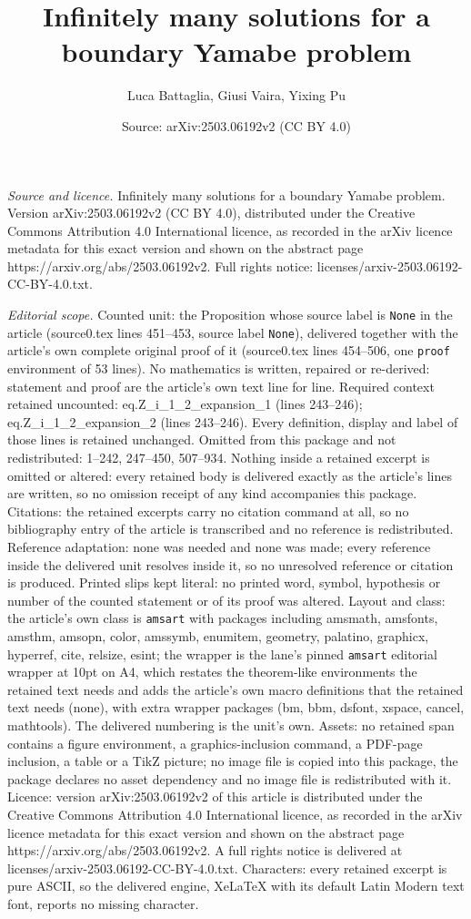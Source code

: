 \documentclass[10pt,a4paper]{amsart}
\title[Infinitely many solutions for a boundary Yamabe problem]{Infinitely many solutions for a boundary Yamabe problem}
\author{Luca Battaglia, Giusi Vaira, Yixing Pu}
\date{Source: arXiv:2503.06192v2 (CC BY 4.0)}
\begin{document}
\maketitle

\noindent\emph{Source and licence.} Infinitely many solutions for a boundary Yamabe problem. Version arXiv:2503.06192v2 (CC BY 4.0), distributed under the Creative Commons Attribution 4.0 International licence, as recorded in the arXiv licence metadata for this exact version and shown on the abstract page https://arxiv.org/abs/2503.06192v2. Full rights notice: licenses/arxiv-2503.06192-CC-BY-4.0.txt.\par\smallskip

\noindent\textit{Editorial scope.} Counted unit: the Proposition whose source label is \texttt{None} in the article (source0.tex lines 451--453, source label \texttt{None}), delivered together with the article's own complete original proof of it (source0.tex lines 454--506, one \texttt{proof} environment of 53 lines). No mathematics is written, repaired or re-derived: statement and proof are the article's own text line for line. Required context retained uncounted: eq.Z\_i\_1\_2\_expansion\_1 (lines 243--246); eq.Z\_i\_1\_2\_expansion\_2 (lines 243--246). Every definition, display and label of those lines is retained unchanged. Omitted from this package and not redistributed: 1--242, 247--450, 507--934. Nothing inside a retained excerpt is omitted or altered: every retained body is delivered exactly as the article's lines are written, so no omission receipt of any kind accompanies this package. Citations: the retained excerpts carry no citation command at all, so no bibliography entry of the article is transcribed and no reference is redistributed. Reference adaptation: none was needed and none was made; every reference inside the delivered unit resolves inside it, so no unresolved reference or citation is produced. Printed slips kept literal: no printed word, symbol, hypothesis or number of the counted statement or of its proof was altered. Layout and class: the article's own class is \texttt{amsart} with packages including amsmath, amsfonts, amsthm, amsopn, color, amssymb, enumitem, geometry, palatino, graphicx, hyperref, cite, relsize, esint; the wrapper is the lane's pinned \texttt{amsart} editorial wrapper at 10pt on A4, which restates the theorem-like environments the retained text needs and adds the article's own macro definitions that the retained text needs (none), with extra wrapper packages (bm, bbm, dsfont, xspace, cancel, mathtools). The delivered numbering is the unit's own. Assets: no retained span contains a figure environment, a graphics-inclusion command, a PDF-page inclusion, a table or a TikZ picture; no image file is copied into this package, the package declares no asset dependency and no image file is redistributed with it. Licence: version arXiv:2503.06192v2 of this article is distributed under the Creative Commons Attribution 4.0 International licence, as recorded in the arXiv licence metadata for this exact version and shown on the abstract page https://arxiv.org/abs/2503.06192v2. A full rights notice is delivered at licenses/arxiv-2503.06192-CC-BY-4.0.txt. Characters: every retained excerpt is pure ASCII, so the delivered engine, XeLaTeX with its default Latin Modern text font, reports no missing character.
\end{document}
